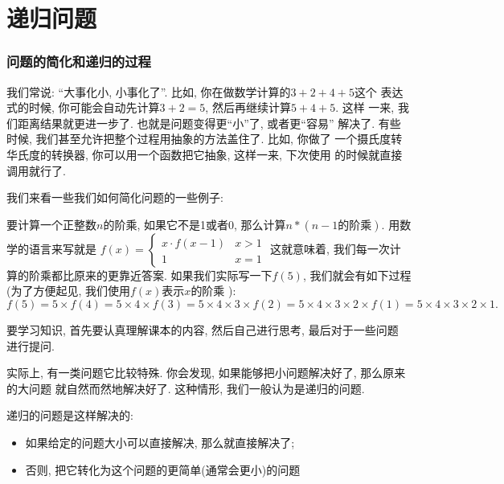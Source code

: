 \part{递归问题}

\section{问题的简化和递归的过程}

我们常说: ``大事化小, 小事化了''. 比如, 你在做数学计算的$3+2+4+5$这个
表达式的时候, 你可能会自动先计算$3+2=5$, 然后再继续计算$5+4+5$. 这样
一来, 我们距离结果就更进一步了. 也就是问题变得更``小''了, 或者更``容易''
解决了. 有些时候, 我们甚至允许把整个过程用抽象的方法盖住了. 比如, 你做了
一个摄氏度转华氏度的转换器, 你可以用一个函数把它抽象, 这样一来, 下次使用
的时候就直接调用就行了. 

我们来看一些我们如何简化问题的一些例子: 

\begin{example}
    要计算一个正整数$n$的阶乘, 如果它不是1或者0, 那么计算$n*(n-1\text{的阶乘})$.
    用数学的语言来写就是
    $f(x)=\begin{cases}
    x\cdot f(x-1) & x>1\\
    1 & x=1
    \end{cases}$
    这就意味着, 我们每一次计算的阶乘都比原来的更靠近答案. 如果我们实际写一下$f(5)$, 
    我们就会有如下过程(为了方便起见, 我们使用$f(x)$表示$x$的阶乘
    ): 
    $$
        f(5) = 5\times f(4) = 5\times 4\times f(3) = 5\times 4\times 3 \times f(2)
        = 5\times 4\times 3\times 2\times f(1) = 5\times 4\times 3\times 2\times 1.  
    $$
\end{example}

\begin{example}
    要学习知识, 首先要认真理解课本的内容, 然后自己进行思考, 最后对于一些问题
    进行提问. %
\end{example}


实际上, 有一类问题它比较特殊. 你会发现, 如果能够把小问题解决好了, 那么原来的大问题
就自然而然地解决好了. 这种情形, 我们一般认为是递归的问题. 

\begin{definition}[递归]
    递归的问题是这样解决的: 
    \begin{itemize}
        \item 如果给定的问题大小可以直接解决, 那么就直接解决了; 
        \item 否则, 把它转化为这个问题的更简单(通常会更小)的问题
    \end{itemize}
\end{definition}

